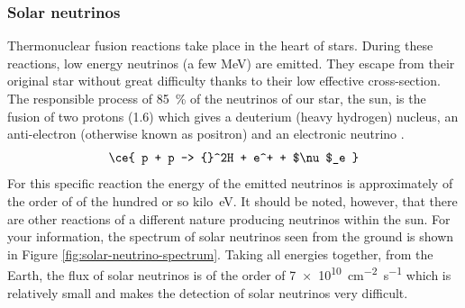 \subsubsection{Solar neutrinos}

Thermonuclear fusion reactions take place in the heart of stars. During these reactions, low energy neutrinos (a few \si{\mega\eV}) are emitted. They escape from their original star without great difficulty thanks to their low effective cross-section. The responsible process of \SI{85}{\percent} of the neutrinos of our star, the sun, is the fusion of two protons  (1.6) which gives a  deuterium (heavy hydrogen) nucleus, an anti-electron  (otherwise known as positron) and an electronic neutrino .
\begin{equation}
\ce{ p + p -> {}^2H + e^+ + $\nu$_e }
\end{equation}
For this specific reaction the energy of the emitted neutrinos is approximately of the order of of the hundred or so \si{kilo\eV}. It should be noted, however, that there are other reactions of a different nature producing neutrinos within the sun. For your information, the spectrum of solar neutrinos seen from the ground is shown in Figure \ref{fig:solar-neutrino-spectrum}. Taking all energies together, from the Earth, the flux of solar neutrinos is of the order of \SI{7e10}{\cm^{-2} \s^{-1}} which is relatively small and makes the detection of solar neutrinos very difficult.

